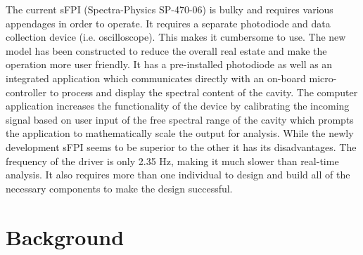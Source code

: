 \documentclass[12pt,journal]{IEEEtran}
\begin{document}
The current sFPI (Spectra-Physics SP-470-06) is bulky and requires various appendages in order to operate. It requires a separate photodiode and data collection device (i.e. oscilloscope). This makes it cumbersome to use. The new model has been constructed to reduce the overall real estate and make the operation more user friendly. It has a pre-installed photodiode as well as an integrated application which communicates directly with an on-board micro-controller to process and display the spectral content of the cavity. The computer application increases the functionality of the device by calibrating the incoming signal based on user input of the free spectral range of the cavity which prompts the application to mathematically scale the output for analysis. While the newly development sFPI seems to be superior to the other it has its disadvantages. The frequency of the driver is only 2.35 Hz, making it much slower than real-time analysis. It also requires more than one individual to design and build all of the necessary components to make the design successful. 



\section{Background} \label{ss:background}
\end{document}
